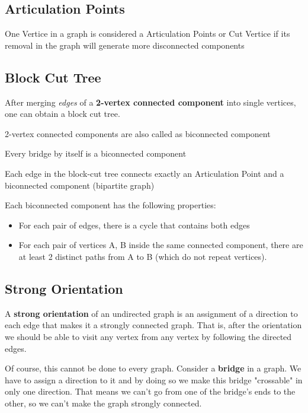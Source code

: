 	
	\subsection{Articulation Points} 

	One Vertice in a graph is considered a Articulation Points or Cut Vertice if its removal in the graph will generate more disconnected components


	\subsection{Block Cut Tree}

	After merging \textit{edges} of a \textbf{2-vertex connected component} into single vertices, one can obtain a block cut tree.

	2-vertex connected components are also called as biconnected component
	
	Every bridge by itself is a biconnected component

	Each edge in the block-cut tree connects exactly an Articulation Point and a biconnected component (bipartite graph)

	Each biconnected component has the following properties:

	\begin{itemize}
		\item For each pair of edges, there is a cycle that contains both edges
		\item For each pair of vertices {A, B} inside the same connected component, there are at least 2 distinct paths from A to B (which do not repeat vertices).
	\end{itemize}

	
	\subsection{Strong Orientation}

	A \textbf{strong orientation} of an undirected graph is an assignment of a direction to each edge that makes it a strongly connected graph.
	That is, after the orientation we should be able to visit any vertex from any vertex by following the directed edges.

	Of course, this cannot be done to every graph. Consider a \textbf{bridge} in a graph.
	We have to assign a direction to it and by doing so we make this bridge "crossable" in only one direction.
	That means we can't go from one of the bridge's ends to the other, so we can't make the graph strongly connected.

